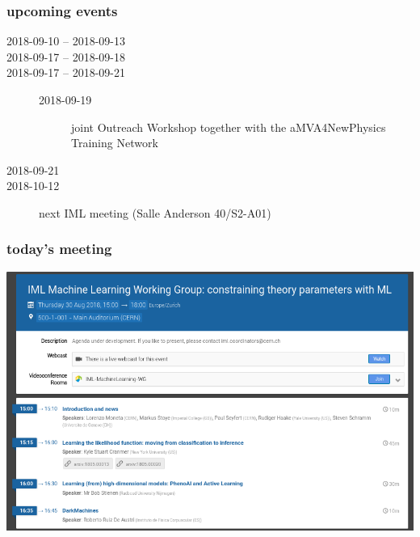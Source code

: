 \begin{frame}
  \frametitle{upcoming events}
  \begin{description}
    \item[2018-09-10 -- 2018-09-13]
    \item[2018-09-17 -- 2018-09-18]
    \item[2018-09-17 -- 2018-09-21]
      \begin{description}
        \item[2018-09-19] {\small{joint Outreach Workshop together with the aMVA4NewPhysics Training Network}}
      \end{description}
    \item[2018-09-21]
    \item[2018-10-12] next IML meeting (Salle Anderson 40/S2-A01)
  \end{description}
\end{frame}

\begin{frame}
  \frametitle{today's meeting}
  \includegraphics[width=.9\textwidth]{./agenda.png}
\end{frame}

